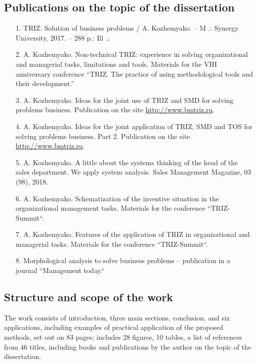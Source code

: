 \subsection{Publications on the topic of the dissertation}
\begin{itemize}
\item[1.] TRIZ. Solution of business problems / A. Kozhemyako. -- M .: Synergy
  University, 2017. -- 288 p.: Ill .;
\item[2.] A. Kozhemyako. Non-technical TRIZ: experience in solving
  organizational and managerial tasks, limitations and tools. Materials for
  the VIII anniversary conference “TRIZ. The practice of using methodological
  tools and their development.”
\item[3.] A. Kozhemyako. Ideas for the joint use of TRIZ and SMD for solving
  problems business. Publication on the site \url{http://www.bmtriz.ru}.
\item[4.] A. Kozhemyako. Ideas for the joint application of TRIZ, SMD and TOS
  for solving problems business. Part 2. Publication on the site
  \url{http://www.bmtriz.ru}.
\item[5.] A. Kozhemyako. A little about the systems thinking of the head of
  the sales department.  We apply system analysis. Sales Management Magazine,
  03 (98), 2018.
\item[6.] A. Kozhemyako. Schematization of the inventive situation in the
  organizational management tasks. Materials for the conference “TRIZ-Summit“.
\item[7.] A. Kozhemyako. Features of the application of TRIZ in organizational
  and managerial tasks. Materials for the conference “TRIZ-Summit“.
\item[8.] Morphological analysis to solve business problems -- publication in
  a journal “Management today.“
\end{itemize}
\subsection{Structure and scope of the work}
The work consists of introduction, three main sections, conclusion, and six
applications, including examples of practical application of the proposed
methods, set out on 83 pages; includes 28 figures, 10 tables, a list of
references from 46 titles, including books and publications by the author on
the topic of the dissertation.
